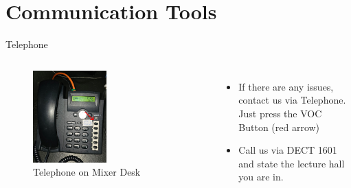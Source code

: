 
\section{Communication Tools}
\begin{frame}{Telephone}
	\begin{columns}[T,onlytextwidth]
		\begin{figure}
			\centering
			\includegraphics[width=0.5\textwidth]{images/telephone.png}
			\caption{Telephone on Mixer Desk}
		\end{figure}
		\begin{itemize}
		\item If there are any issues, contact us via Telephone. Just press the VOC Button (red arrow)
		\item Call us via DECT 1601 and state the lecture hall you are in.
		\end{itemize}

	\end{columns}
\end{frame}


